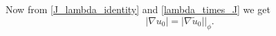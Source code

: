 \documentclass[a4paper, 10pt, twoside, notitlepage]{amsart}
\theoremstyle{plain}
\numberwithin{equation}{section}
\newcommand {\R} {\mathbb{R}} \newcommand {\Z} {\mathbb{Z}}
\newcommand {\p} {\partial}
\newcommand{\tre}{\textcolor{red}}
\newcommand{\abs}[1]{\lvert #1 \rvert}
\newcommand{\chr}[2]{\Gamma^{#1}_{\hphantom{#1}#2}}
\DeclareMathOperator{\tr}{tr}
\begin{document}
%
Now from \eqref{J_lambda_identity} and \eqref{lambda_times_J} we get
\begin{equation}\label{norm_u_tilde_u}
	\abs{\nabla u_0}=\abs{\nabla\tilde u_0}|_{\phi}.
\end{equation}
\end{document}
